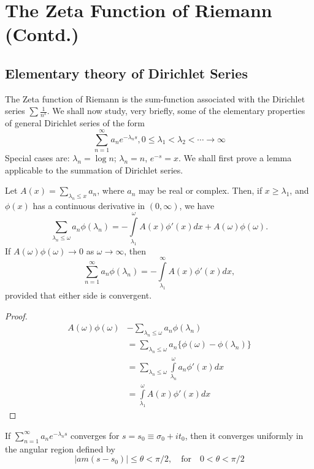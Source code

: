 \chapter{The Zeta Function of Riemann (Contd.)}\label{chap9}

\setcounter{section}{1}
\section[Elementary theory of Dirichlet Series]{Elementary theory of Dirichlet Series
  \cite{key10}}\label{chap9:sec2}\pageoriginale

The Zeta function of Riemann is the sum-function associated with the
Dirichlet series $\sum\frac{1}{n^s}$. We shall now study, very
briefly, some of the elementary properties of general Dirichlet series
of the form
$$ 
\sum\limits^\infty_{n=1} a_n e^{-\lambda_{n} s}, 0 \leq \lambda_1 <
\lambda_2 < \cdots  \to \infty
$$
Special cases are: $\lambda_n = \log n $; $\lambda_n = n$, $e^{-s} =
x$. We shall first prove a lemma applicable to the summation of
Dirichlet series.

\begin{lemma*}
Let $A(x) = \sum\limits_{\lambda_n \leq x} a_n$, where $a_n$ may be
real or complex. Then, if $x \geq \lambda_1$, and $\phi(x)$ has a
continuous derivative in $(0,\infty)$, we have
$$
\sum\limits_{\lambda_n \leq \omega} a_n \phi (\lambda_n) = -
\int\limits^\omega_{\lambda_1} A(x) \phi'(x) dx + A(\omega) \phi (\omega).
$$
If $A(\omega) \phi (\omega) \to 0$ as $\omega \to \infty$, then 
$$
\sum\limits^\infty_{n=1} a_n \phi (\lambda_n) = -
\int\limits^\infty_{\lambda_1} A(x) \phi'(x) dx,
$$
provided that either side is convergent.
\end{lemma*}

\begin{proof}
\begin{align*}
A(\omega)\phi(\omega) & - \sum\limits_{\lambda_n \leq \omega} a_n \phi
(\lambda_n)\\
& = \sum\limits_{\lambda_n \leq \omega} a_n \{\phi(\omega) - \phi
(\lambda_n)\} \\
& = \sum\limits_{\lambda_n \leq \omega} \int\limits^\omega_{\lambda_n}
a_n \phi'(x) dx \\
& = \int\limits^\omega_{\lambda_1} A(x) \phi'(x) dx 
\end{align*}\pageoriginale
\end{proof}

\setcounter{thm}{0}
\begin{thm}\label{chap9:thm1}
If $\sum\limits^\infty_{n=1} a_n e^{-\lambda_n s}$ converges for $s =
s_0 \equiv \sigma_0 + it_0$, then it converges uniformly in the
angular region defined by 
$$
|am(s-s_0)| \leq \theta < \pi/2, \quad \text{for} \quad 0 < \theta <
\pi/2  
$$
\end{thm}

